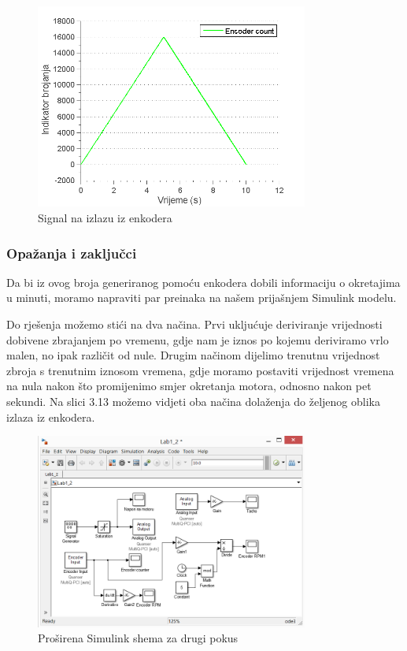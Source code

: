 \documentclass[12pt,a4paper]{article}
\begin{document}
\begin{figure}[!h]
	\begin{center}
	\includegraphics[width=0.8\textwidth] {encoderCnt.png}
    \caption{Signal na izlazu iz enkodera}
    \end{center}
\end{figure}

\subsubsection{Opažanja i zaključci}
Da bi iz ovog broja generiranog pomoću enkodera dobili informaciju o okretajima u minuti, moramo napraviti par preinaka na našem prijašnjem Simulink modelu.\newline

Do rješenja možemo stići na dva načina.
Prvi ukljućuje deriviranje vrijednosti dobivene zbrajanjem po vremenu, gdje nam je iznos po kojemu deriviramo vrlo malen, no ipak različit od nule. 
Drugim načinom dijelimo trenutnu vrijednost zbroja s trenutnim iznosom vremena, gdje moramo postaviti vrijednost vremena na nula nakon što promijenimo smjer okretanja motora, odnosno nakon pet sekundi. Na slici 3.13 možemo vidjeti oba načina dolaženja do željenog oblika izlaza iz enkodera. \newpage

\begin{figure}[!h]
	\begin{center}
	\includegraphics[width=0.8\textwidth] {model2full.png}
    \caption{Proširena Simulink shema za drugi pokus}
    \end{center}
\end{figure}
\end{document}
